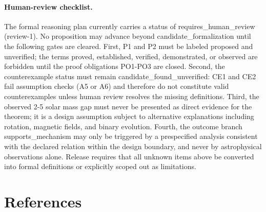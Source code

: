 \documentclass[conference]{IEEEtran}
\begin{document}
\paragraph{Human-review checklist.} The formal reasoning plan currently carries a status of requires\_human\_review (review-1). No proposition may advance beyond candidate\_formalization until the following gates are cleared. First, P1 and P2 must be labeled proposed and unverified; the terms proved, established, verified, demonstrated, or observed are forbidden until the proof obligations PO1-PO3 are closed. Second, the counterexample status must remain candidate\_found\_unverified: CE1 and CE2 fail assumption checks (A5 or A6) and therefore do not constitute valid counterexamples unless human review resolves the missing definitions. Third, the observed 2-5 solar mass gap must never be presented as direct evidence for the theorem; it is a design assumption subject to alternative explanations including rotation, magnetic fields, and binary evolution. Fourth, the outcome branch supports\_mechanism may only be triggered by a prespecified analysis consistent with the declared relation within the design boundary, and never by astrophysical observations alone. Release requires that all unknown items above be converted into formal definitions or explicitly scoped out as limitations.\section*{References}


\end{document}

